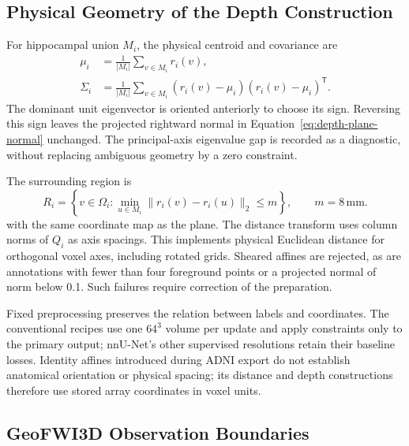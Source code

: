 \subsection{Physical Geometry of the Depth Construction}

For hippocampal union $M_i$, the physical centroid and covariance are
\begin{equation}
\begin{aligned}
\mu_i&=\frac{1}{|M_i|}\sum_{v\in M_i}r_i(v),\\
\Sigma_i&=\frac{1}{|M_i|}\sum_{v\in M_i}
       (r_i(v)-\mu_i)(r_i(v)-\mu_i)^{\mathsf T}.
\end{aligned}
\label{eq:depth-centroid-covariance}
\end{equation}
The dominant unit eigenvector is oriented anteriorly to choose its
sign. Reversing this sign leaves the projected rightward normal in
Equation~\ref{eq:depth-plane-normal} unchanged. The principal-axis
eigenvalue gap is recorded as a diagnostic, without replacing
ambiguous geometry by a zero constraint.

The surrounding region is
\begin{equation}
R_i=\left\{v\in\Omega_i:
       \min_{u\in M_i}\|r_i(v)-r_i(u)\|_2\leq m\right\},
\qquad m=8\,\mathrm{mm}.
\label{eq:depth-region-of-interest}
\end{equation}
with the same coordinate map as the plane. The distance transform uses
column norms of $Q_i$ as axis spacings. This implements physical
Euclidean distance for orthogonal voxel axes, including rotated grids.
Sheared affines are rejected, as are annotations with fewer than four
foreground points or a projected normal of norm below 0.1. Such
failures require correction of the preparation.

Fixed preprocessing preserves the relation between labels and
coordinates. The conventional recipes use one $64^3$ volume per update
and apply constraints only to the primary output; nnU-Net's other
supervised resolutions retain their baseline losses. Identity affines
introduced during ADNI export do not establish anatomical orientation
or physical spacing; its distance and depth constructions therefore
use stored array coordinates in voxel units.

\subsection{GeoFWI3D Observation Boundaries}
\label{sec:geo-boundaries}

